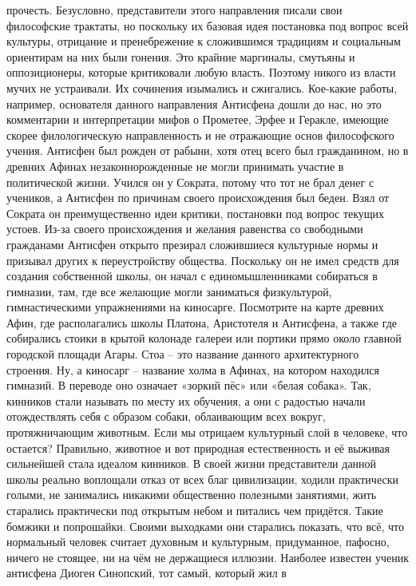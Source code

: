 прочесть. Безусловно, представители этого направления писали свои философские
трактаты, но поскольку их базовая идея постановка под вопрос всей культуры,
отрицание и пренебрежение к сложившимся традициям и социальным ориентирам на них
были гонения. Это крайние маргиналы, смутьяны и оппозиционеры, которые
критиковали любую власть. Поэтому никого из власти мучих не устраивали. Их
сочинения изымались и сжигались. Кое-какие работы, например, основателя данного
направления Антисфена дошли до нас, но это комментарии и интерпретации мифов о
Прометее, Эрфее и Геракле, имеющие скорее филологическую направленность и не
отражающие основ философского учения. Антисфен был рожден от рабыни, хотя отец
всего был гражданином, но в древних Афинах незаконнорожденные не могли принимать
участие в политической жизни. Учился он у Сократа, потому что тот не брал денег
с учеников, а Антисфен по причинам своего происхождения был беден. Взял от
Сократа он преимущественно идеи критики, постановки под вопрос текущих устоев.
Из-за своего происхождения и желания равенства со свободными гражданами Антисфен
открыто презирал сложившиеся культурные нормы и призывал других к переустройству
общества. Поскольку он не имел средств для создания собственной школы, он начал
с единомышленниками собираться в гимназии, там, где все желающие могли
заниматься физкультурой, гимнастическими упражнениями на киносарге. Посмотрите
на карте древних Афин, где располагались школы Платона, Аристотеля и Антисфена,
а также где собирались стоики в крытой колонаде галереи или портики прямо около
главной городской площади Агары. Стоа – это название данного архитектурного
строения. Ну, а киносарг – название холма в Афинах, на котором находился
гимназий. В переводе оно означает «зоркий пёс» или «белая собака». Так, кинников
стали называть по месту их обучения, а они с радостью начали отождествлять себя
с образом собаки, облаивающим всех вокруг, протяжничающим животным. Если мы
отрицаем культурный слой в человеке, что остается? Правильно, животное и вот
природная естественность и её выживая сильнейшей стала идеалом кинников. В своей
жизни представители данной школы реально воплощали отказ от всех благ
цивилизации, ходили практически голыми, не занимались никакими общественно
полезными занятиями, жить старались практически под открытым небом и питались
чем придётся. Такие бомжики и попрошайки. Своими выходками они старались
показать, что всё, что нормальный человек считает духовным и культурным,
придуманное, пафосно, ничего не стоящее, ни на чём не держащиеся иллюзии.
Наиболее известен ученик антисфена Диоген Синопский, тот самый, который жил в

